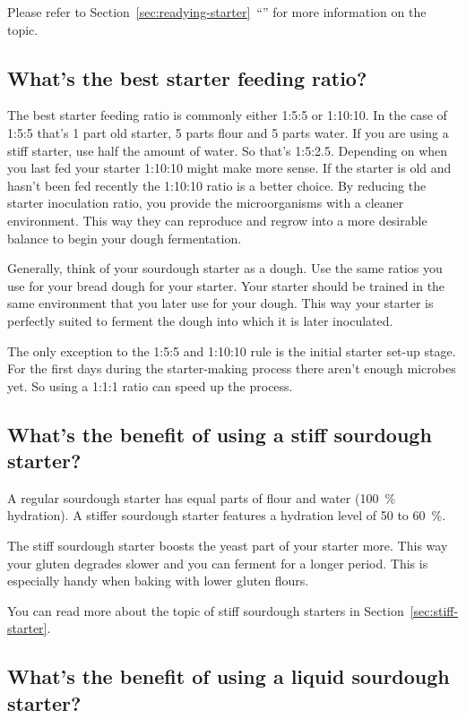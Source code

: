 Please refer to
Section~\ref{sec:readying-starter}~``''
for more information on the topic.



\subsection{What's the best starter feeding ratio?}

The best starter feeding ratio is commonly either 1:5:5 or 1:10:10.
In the case of 1:5:5 that's 1 part old starter,
5 parts flour and 5 parts water. If you are using a stiff starter,
use half the amount of water. So that's 1:5:2.5. Depending on when
you last fed your starter 1:10:10 might make more sense. If the starter
is old and hasn't been fed recently the 1:10:10 ratio is a better choice.
By reducing the starter inoculation ratio, you provide the microorganisms
with a cleaner environment. This way they can reproduce and regrow
into a more desirable balance to begin your dough fermentation.

Generally, think of your sourdough starter as a dough. Use the same
ratios you use for your bread dough for your starter. Your starter
should be trained in the same environment that you later use
for your dough. This way your starter is perfectly suited to
ferment the dough into which it is later inoculated.

The only exception to the 1:5:5 and 1:10:10 rule is the initial
starter set-up stage. For the first days during the starter-making
process there aren't enough microbes yet. So using a 1:1:1 ratio
can speed up the process.
\subsection{What's the benefit of using a stiff sourdough starter?}

A regular sourdough starter has equal parts of
flour and water (\qty{100}{\percent} hydration). A stiffer
sourdough starter features a hydration level of 50 to \qty{60}{\percent}.

The stiff sourdough starter boosts the yeast part
of your starter more. This way your gluten degrades
slower and you can ferment for a longer period. This
is especially handy when baking with lower gluten flours.

You can read more about the topic of stiff sourdough
starters in Section~\ref{sec:stiff-starter}.

\subsection{What's the benefit of using a liquid sourdough starter?}

